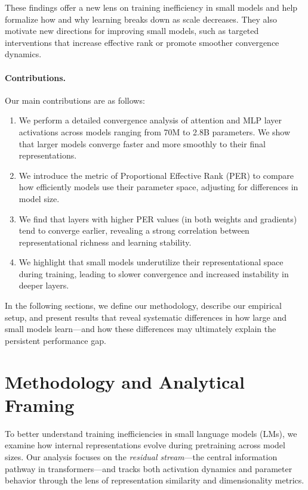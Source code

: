 These findings offer a new lens on training inefficiency in small models and help formalize how and why learning breaks down as scale decreases. They also motivate new directions for improving small models, such as targeted interventions that increase effective rank or promote smoother convergence dynamics.

\paragraph{Contributions.}
Our main contributions are as follows:
\begin{enumerate}
    \item We perform a detailed convergence analysis of attention and MLP layer activations across models ranging from 70M to 2.8B parameters. We show that larger models converge faster and more smoothly to their final representations.

    \item We introduce the metric of Proportional Effective Rank (PER) to compare how efficiently models use their parameter space, adjusting for differences in model size.

    \item We find that layers with higher PER values (in both weights and gradients) tend to converge earlier, revealing a strong correlation between representational richness and learning stability.

    \item We highlight that small models underutilize their representational space during training, leading to slower convergence and increased instability in deeper layers.
\end{enumerate}

In the following sections, we define our methodology, describe our empirical setup, and present results that reveal systematic differences in how large and small models learn—and how these differences may ultimately explain the persistent performance gap.


\section{Methodology and Analytical Framing}
\label{sec:methodology}

To better understand training inefficiencies in small language models (LMs), we examine how internal representations evolve during pretraining across model sizes. Our analysis focuses on the \textit{residual stream}---the central information pathway in transformers---and tracks both activation dynamics and parameter behavior through the lens of representation similarity and dimensionality metrics. 

